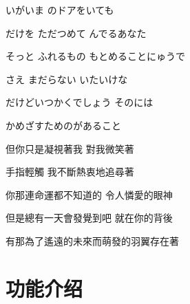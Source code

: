 \documentclass{article}
\begin{document}
\twocolumn                       %
\large
\linespread{2.2}
\selectfont

いがいま のドアをいても

だけを ただつめて んでるあなた

そっと ふれるもの もとめることにゅうで

さえ まだらない いたいけな

だけどいつかくでしょう そのには

かめざすためのがあること

\newpage           %

{


但你只是凝視著我 對我微笑著

手指輕觸 我不斷熱衷地追尋著

你那連命運都不知道的 令人憐愛的眼神

但是總有一天會發覺到吧 就在你的背後

有那為了遙遠的未來而萌發的羽翼存在著

}

\section*{功能介绍}
\end{document}
